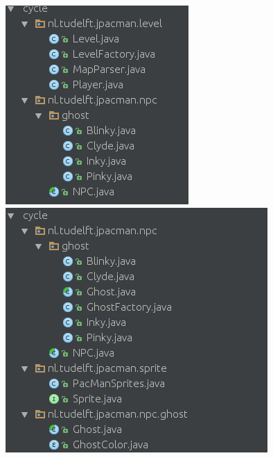 \documentclass[12pt, openany]{report}
\begin{document}
\begin{figure}[!h]
	\centering
	\includegraphics[scale=0.5]{Images/DependencyCycle3.png}
	\includegraphics[scale=0.5]{Images/DependencyCycle4.png}  
\end{figure}
\end{document}
